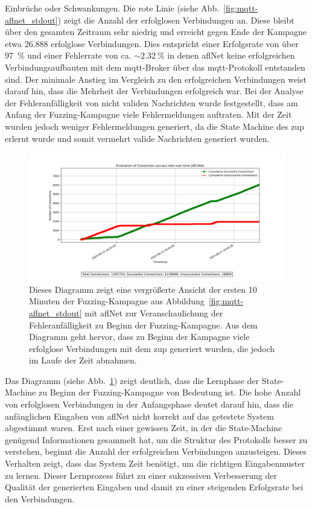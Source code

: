Einbrüche oder Schwankungen.
Die rote Linie (siehe Abb.~\ref{fig:mqtt-aflnet_stdout}) zeigt die Anzahl der erfolglosen Verbindungen an.
Diese bleibt über den gesamten Zeitraum sehr niedrig und erreicht gegen Ende der Kampagne etwa 26.888 erfolglose Verbindungen.
Dies entspricht einer Erfolgsrate von über \SI{97}{\percent} und einer Fehlerrate von ca. $\sim \SI{2.32}{\percent}$
in denen \gls{afl}Net keine erfolgreichen Verbindungsaufbauten mit dem \gls{mqtt}-Broker über das \gls{mqtt}-Protokoll
entstanden sind.
Der minimale Anstieg im Vergleich zu den erfolgreichen Verbindungen weist darauf hin, dass die Mehrheit der Verbindungen
erfolgreich war.
Bei der Analyse der Fehleranfälligkeit von nicht validen Nachrichten wurde festgestellt, dass am Anfang der Fuzzing-Kampagne
viele Fehlermeldungen auftraten.
Mit der Zeit wurden jedoch weniger Fehlermeldungen generiert, da die State Machine des \gls{zup} erlernt wurde und somit
vermehrt valide Nachrichten generiert wurden.
\begin{figure}[H]
    \centering
    \includegraphics[width=\textwidth]{img/connection_evaluation_aflnet_beginning}
    \caption[Diagram zur Auswertung erfolgreicher Verbindungsaufbauten mit dem \gls{mqtt}-Protokoll zu Beginn der Fuzzing Kampagne]{
        Dieses Diagramm zeigt eine vergrößerte Ansicht der ersten
        10 Minuten der Fuzzing-Kampagne aus Abbildung~\ref{fig:mqtt-aflnet_stdout} mit \gls{afl}Net zur Veranschaulichung der Fehleranfälligkeit zu Beginn der Fuzzing-Kampagne.
        Aus dem Diagramm geht hervor, dass zu Beginn der Kampagne viele erfolglose Verbindungen mit dem \gls{zup} generiert
        wurden, die jedoch im Laufe der Zeit abnahmen.
    }
    \label{fig:mqtt-aflnet_stdout_beginning}
\end{figure}
\noindent Das Diagramm (siehe Abb.~\ref{fig:mqtt-aflnet_stdout_beginning}) zeigt deutlich, dass die Lernphase der State-Machine
zu Beginn der Fuzzing-Kampagne von Bedeutung ist.
Die hohe Anzahl von erfolglosen Verbindungen in der Anfangsphase deutet darauf hin, dass die anfänglichen Eingaben von 
\gls{afl}Net nicht korrekt auf das getestete System abgestimmt waren. 
Erst nach einer gewissen Zeit, in der die State-Machine genügend Informationen gesammelt hat, um die Struktur des Protokolls 
besser zu verstehen, beginnt die Anzahl der erfolgreichen Verbindungen anzusteigen.
Dieses Verhalten zeigt, dass das System Zeit benötigt, um die richtigen Eingabenmuster zu lernen. 
Dieser Lernprozess führt zu einer sukzessiven Verbesserung der Qualität der generierten Eingaben und damit zu einer 
steigenden Erfolgsrate bei den Verbindungen.
